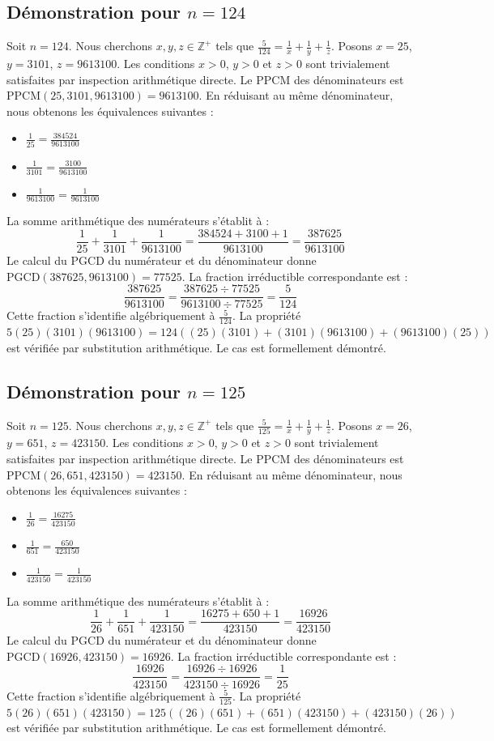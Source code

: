 \documentclass[12pt,a4paper]{article}
\begin{document}
\subsection{Démonstration pour $n = 124$}
Soit $n = 124$. Nous cherchons $x, y, z \in \mathbb{Z}^{+}$ tels que $\frac{5}{124} = \frac{1}{x} + \frac{1}{y} + \frac{1}{z}$.
Posons $x = 25$, $y = 3101$, $z = 9613100$.
Les conditions $x > 0$, $y > 0$ et $z > 0$ sont trivialement satisfaites par inspection arithmétique directe.
Le PPCM des dénominateurs est $\text{PPCM}(25, 3101, 9613100) = 9613100$.
En réduisant au même dénominateur, nous obtenons les équivalences suivantes :
\begin{itemize}
    \item $\frac{1}{25} = \frac{384524}{9613100}$
    \item $\frac{1}{3101} = \frac{3100}{9613100}$
    \item $\frac{1}{9613100} = \frac{1}{9613100}$
\end{itemize}
La somme arithmétique des numérateurs s'établit à :
$$ \frac{1}{25} + \frac{1}{3101} + \frac{1}{9613100} = \frac{384524 + 3100 + 1}{9613100} = \frac{387625}{9613100} $$
Le calcul du PGCD du numérateur et du dénominateur donne $\text{PGCD}(387625, 9613100) = 77525$.
La fraction irréductible correspondante est :
$$ \frac{387625}{9613100} = \frac{387625 \div 77525}{9613100 \div 77525} = \frac{5}{124} $$
Cette fraction s'identifie algébriquement à $\frac{5}{124}$.
La propriété $5(25)(3101)(9613100) = 124((25)(3101) + (3101)(9613100) + (9613100)(25))$ est vérifiée par substitution arithmétique.
Le cas est formellement démontré.

\subsection{Démonstration pour $n = 125$}
Soit $n = 125$. Nous cherchons $x, y, z \in \mathbb{Z}^{+}$ tels que $\frac{5}{125} = \frac{1}{x} + \frac{1}{y} + \frac{1}{z}$.
Posons $x = 26$, $y = 651$, $z = 423150$.
Les conditions $x > 0$, $y > 0$ et $z > 0$ sont trivialement satisfaites par inspection arithmétique directe.
Le PPCM des dénominateurs est $\text{PPCM}(26, 651, 423150) = 423150$.
En réduisant au même dénominateur, nous obtenons les équivalences suivantes :
\begin{itemize}
    \item $\frac{1}{26} = \frac{16275}{423150}$
    \item $\frac{1}{651} = \frac{650}{423150}$
    \item $\frac{1}{423150} = \frac{1}{423150}$
\end{itemize}
La somme arithmétique des numérateurs s'établit à :
$$ \frac{1}{26} + \frac{1}{651} + \frac{1}{423150} = \frac{16275 + 650 + 1}{423150} = \frac{16926}{423150} $$
Le calcul du PGCD du numérateur et du dénominateur donne $\text{PGCD}(16926, 423150) = 16926$.
La fraction irréductible correspondante est :
$$ \frac{16926}{423150} = \frac{16926 \div 16926}{423150 \div 16926} = \frac{1}{25} $$
Cette fraction s'identifie algébriquement à $\frac{5}{125}$.
La propriété $5(26)(651)(423150) = 125((26)(651) + (651)(423150) + (423150)(26))$ est vérifiée par substitution arithmétique.
Le cas est formellement démontré.
\end{document}

